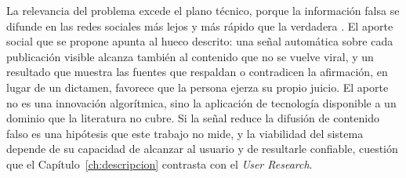 La relevancia del problema excede el plano técnico, porque la información falsa se difunde en las redes sociales más lejos y más rápido que la verdadera \parencite{VosoughiEtAl2018}. El aporte social que se propone apunta al hueco descrito: una señal automática sobre cada publicación visible alcanza también al contenido que no se vuelve viral, y un resultado que muestra las fuentes que respaldan o contradicen la afirmación, en lugar de un dictamen, favorece que la persona ejerza su propio juicio. El aporte no es una innovación algorítmica, sino la aplicación de tecnología disponible a un dominio que la literatura no cubre. Si la señal reduce la difusión de contenido falso es una hipótesis que este trabajo no mide, y la viabilidad del sistema depende de su capacidad de alcanzar al usuario y de resultarle confiable, cuestión que el Capítulo~\ref{ch:descripcion} contrasta con el \textit{User Research}.

